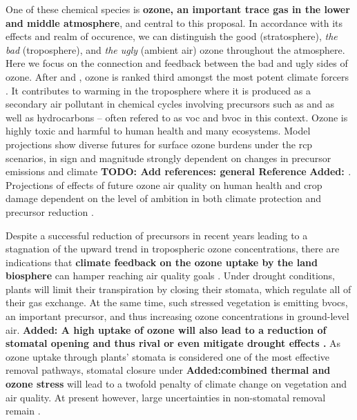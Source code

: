 One of these chemical species is \textbf{ozone, an important trace gas in the lower and middle atmosphere}, and central to this proposal. In accordance with its effects and realm of occurence, we can distinguish the good (stratosphere), \emph{the bad} (troposphere), and \emph{the ugly} (ambient air) ozone throughout the atmosphere. Here we focus on the connection and feedback between the bad and ugly sides of ozone. After  and , ozone is ranked third amongst the most potent climate forcers \parencite{IPCC2013c8}.
It contributes to warming in the troposphere where it is produced as a secondary air pollutant in chemical cycles involving precursors such as  and  as well as hydrocarbons -- often refered to as \gls{voc} and \gls{bvoc} in this context. Ozone is highly toxic and harmful to human health and many ecosystems. Model projections show diverse futures for surface ozone burdens under the \gls{rcp} scenarios, in sign and magnitude strongly dependent on changes in precursor emissions and climate \textbf{\color{red}TODO: Add references: general Reference} \textbf{\color{blue}Added: \parencites{JGR:Rieder2015}{AE:Rieder2018}{Nat:Skeie2020}}. Projections of effects of future ozone air quality on human health and crop damage dependent on the level of ambition in both climate protection and precursor reduction \parencite{PTRS:Schneidemesser2020}.

Despite a successful reduction of precursors in recent years leading to a stagnation of the upward trend in tropospheric ozone concentrations, there are indications that \textbf{climate feedback on the ozone uptake by the land biosphere} can hamper reaching air quality goals \parencite{NCC:Lin2020}. Under drought conditions, plants will limit their transpiration by closing their stomata, which regulate all of their gas exchange. At the same time, such stressed vegetation is emitting \glspl{bvoc}, an important precursor, and thus increasing ozone concentrations \ch{[O_3]} in ground-level air. \textbf{\color{blue}Added: A high uptake of ozone will also lead to a reduction of stomatal opening and thus rival or even mitigate drought effects \parencite{BGS:Peron2021}.} As ozone uptake through plants’ stomata is considered one of the most effective removal pathways, stomatal closure under \textbf{\color{blue}Added:combined thermal and ozone stress} will lead to a twofold penalty of climate change on vegetation and air quality. At present however, large uncertainties in non-stomatal removal remain \parencite{RG:Clifton2020}.

